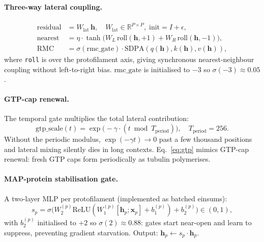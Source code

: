 \documentclass[11pt]{article}
\theoremstyle{definition}
\newcommand{\RR}{\mathbb{R}}
\newcommand{\vh}{\mathbf{h}}
\newcommand{\vx}{\mathbf{x}}
\newcommand{\sigmoid}{\sigma}
\begin{document}
\paragraph{Three-way lateral coupling.}
\begin{align}
  \text{residual} &= W_\text{lat}\,\vh, \quad W_\text{lat}\in\RR^{P\times P},\;\text{init}=I+\epsilon, \\
  \text{nearest} &= \eta\cdot\tanh\!\bigl(W_L\,\mathrm{roll}(\vh,+1)+W_R\,\mathrm{roll}(\vh,-1)\bigr), \label{eq:roll}\\
  \text{RMC} &= \sigmoid(\text{rmc\_gate})\cdot\mathrm{SDPA}(q(\vh),k(\vh),v(\vh)),
\end{align}
where \texttt{roll} is over the protofilament axis, giving synchronous nearest-neighbour coupling without left-to-right bias. $\text{rmc\_gate}$ is initialised to $-3$ so $\sigmoid(-3)\approx 0.05$.

\paragraph{GTP-cap renewal.}
The temporal gate multiplies the total lateral contribution:
\begin{equation}
  \text{gtp\_scale}(t) = \exp\!\bigl(-\gamma\cdot(t\bmod T_\text{period})\bigr), \quad T_\text{period}=256.
  \label{eq:gtp}
\end{equation}
Without the periodic modulus, $\exp(-\gamma t)\to 0$ past a few thousand positions and lateral mixing silently dies in long contexts. Eq.~\eqref{eq:gtp} mimics GTP-cap renewal: fresh GTP caps form periodically as tubulin polymerises.

\paragraph{MAP-protein stabilisation gate.}
A two-layer MLP per protofilament (implemented as batched einsums):
\begin{equation}
  s_p = \sigmoid\!\bigl(W_2^{(p)}\mathrm{ReLU}(W_1^{(p)}[\vh_p;\vx_p]+b_1^{(p)})+b_2^{(p)}\bigr)\in(0,1),
\end{equation}
with $b_2^{(p)}$ initialised to $+2$ so $\sigmoid(2)\approx 0.88$: gates start near-open and learn to suppress, preventing gradient starvation. Output: $\vh_p\leftarrow s_p\cdot\vh_p$.
\end{document}
